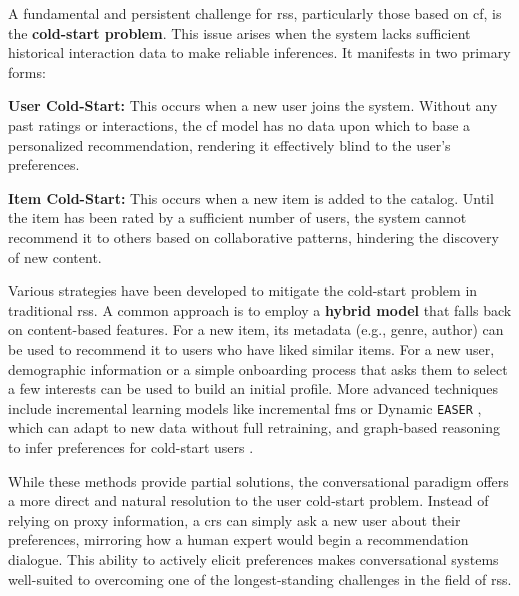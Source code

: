 A fundamental and persistent challenge for \aclp{rs}, particularly those based on \acl{cf}, is the \textbf{cold-start problem}. This issue arises when the system lacks sufficient historical interaction data to make reliable inferences. It manifests in two primary forms:

\begin{compactitem}[\textbullet]
    \item \textbf{User Cold-Start:} This occurs when a new user joins the system. Without any past ratings or interactions, the \acs{cf} model has no data upon which to base a personalized recommendation, rendering it effectively blind to the user's preferences.
    \item \textbf{Item Cold-Start:} This occurs when a new item is added to the catalog. Until the item has been rated by a sufficient number of users, the system cannot recommend it to others based on collaborative patterns, hindering the discovery of new content.
\end{compactitem}

Various strategies have been developed to mitigate the cold-start problem in traditional \acp{rs}. A common approach is to employ a \textbf{hybrid model} that falls back on content-based features. For a new item, its metadata (e.g., genre, author) can be used to recommend it to users who have liked similar items. For a new user, demographic information or a simple onboarding process that asks them to select a few interests can be used to build an initial profile. More advanced techniques include incremental learning models like incremental \acp{fm} \cite{COLD-START-INCREMENTAL-FM} or Dynamic \texttt{EASER} \cite{COLD-START-DYN-EASER}, which can adapt to new data without full retraining, and graph-based reasoning to infer preferences for cold-start users \cite{SOTA-GRAPH-REASONING-COLD-START}.

While these methods provide partial solutions, the conversational paradigm offers a more direct and natural resolution to the user cold-start problem. Instead of relying on proxy information, a \ac{crs} can simply ask a new user about their preferences, mirroring how a human expert would begin a recommendation dialogue. This ability to actively elicit preferences makes conversational systems well-suited to overcoming one of the longest-standing challenges in the field of \aclp{rs}.